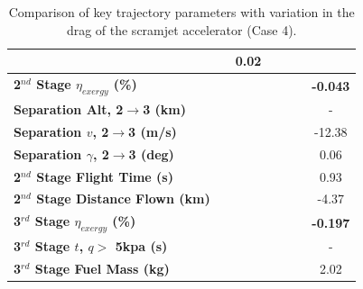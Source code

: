 \begin{table}[ht!]
\begin{tabular}{l c c c c c c}
		& \firstsecondSeparationgammaCdOneHundredTenNoReturn
		&0.02
		\\
		\hline 
		\textbf{2$^{nd}$ Stage $\eta_{exergy}$ (\%)}
		& \textbf{\secondExergyEffCdNinetyNoReturn}
		& \textbf{\secondExergyEffCdNinetyFiveNoReturn}
		& \textbf{\secondExergyEffCdStandardNoReturn}
		& \textbf{\secondExergyEffCdOneHundredFiveNoReturn}
		& \textbf{\secondExergyEffCdOneHundredTenNoReturn}
		& \textbf{-0.043}
		\\
		\textbf{Separation Alt, 2$\rightarrow$3 (km)}
		& \secondthirdSeparationAltCdNinetyNoReturn
		& \secondthirdSeparationAltCdNinetyFiveNoReturn
		& \secondthirdSeparationAltCdStandardNoReturn
		& \secondthirdSeparationAltCdOneHundredFiveNoReturn
		& \secondthirdSeparationAltCdOneHundredTenNoReturn
		& -
		\\
		\textbf{Separation $v$, 2$\rightarrow$3 (m/s)}
		& \secondthirdSeparationvCdNinetyNoReturn
		& \secondthirdSeparationvCdNinetyFiveNoReturn
		& \secondthirdSeparationvCdStandardNoReturn
		& \secondthirdSeparationvCdOneHundredFiveNoReturn
		& \secondthirdSeparationvCdOneHundredTenNoReturn
		&-12.38
		\\
		\textbf{Separation $\gamma$, 2$\rightarrow$3 (deg)}
		& \secondthirdSeparationgammaCdNinetyNoReturn
		& \secondthirdSeparationgammaCdNinetyFiveNoReturn
		& \secondthirdSeparationgammaCdStandardNoReturn
		& \secondthirdSeparationgammaCdOneHundredFiveNoReturn
		& \secondthirdSeparationgammaCdOneHundredTenNoReturn
		&0.06
		\\
		\textbf{2$^{nd}$ Stage Flight Time (s)}
		& \secondFlightTimeCdNinetyNoReturn
		& \secondFlightTimeCdNinetyFiveNoReturn
		& \secondFlightTimeCdStandardNoReturn
		& \secondFlightTimeCdOneHundredFiveNoReturn
		& \secondFlightTimeCdOneHundredTenNoReturn
		&0.93
		\\
		\textbf{2$^{nd}$ Stage Distance Flown (km)}
		& \SecondDistCdNinetyNoReturn
		& \SecondDistCdNinetyFiveNoReturn
		& \SecondDistCdStandardNoReturn
		& \SecondDistCdOneHundredFiveNoReturn
		& \SecondDistCdOneHundredTenNoReturn
		&-4.37
		\\
		\hline 
		\textbf{3$^{rd}$ Stage $\eta_{exergy}$ (\%)}
		& \textbf{\thirddExergyEffCdNinetyNoReturn}
		& \textbf{\thirddExergyEffCdNinetyFiveNoReturn}
		& \textbf{\thirddExergyEffCdStandardNoReturn}
		& \textbf{\thirddExergyEffCdOneHundredFiveNoReturn}
		& \textbf{\thirddExergyEffCdOneHundredTenNoReturn}
		& \textbf{-0.197}
		\\
		\textbf{3$^{rd}$ Stage $t$, $q >$ 5kpa (s)}
		& \thirdqOverFiveCdNinetyNoReturn
		& \thirdqOverFiveCdNinetyFiveNoReturn
		& \thirdqOverFiveCdStandardNoReturn
		& \thirdqOverFiveCdOneHundredFiveNoReturn
		& \thirdqOverFiveCdOneHundredTenNoReturn
		& -
		\\
		\textbf{3$^{rd}$ Stage Fuel Mass (kg)}
		& \thirdmFuelCdNinetyNoReturn
		& \thirdmFuelCdNinetyFiveNoReturn
		& \thirdmFuelCdStandardNoReturn
		& \thirdmFuelCdOneHundredFiveNoReturn
		& \thirdmFuelCdOneHundredTenNoReturn
		&2.02
		\\
		\hline 
	\end{tabular} 
	\caption{Comparison of key trajectory parameters with variation in the drag of the scramjet accelerator (Case 4).}
	\label{tab:DragVariationNoReturn}
\end{table}
